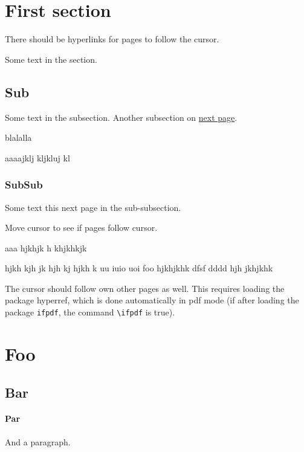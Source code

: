 \documentclass{article}
\begin{document}
\section{First section}

There should be hyperlinks for pages to follow the cursor.  

\tableofcontents



Some text in the section.  
 
\subsection {Sub}

Some text in the subsection. 
Another subsection on \hyperlink{next}{next page}.


blalalla  
\newpage

aaaajklj kljkluj kl
\subsubsection {SubSub} 

Some text this \hypertarget{next}{next page} in the sub-subsection. 

Move cursor to see if pages follow cursor.

\newpage

aaa hjkhjk h
\newpage
khjkhkjk

hjkh kjh jk  hjh kj hjkh k uu iuio uoi foo
hjkhjkhk  dfsf dddd hjh jkhjkhk


The cursor should follow own other pages as well.
This requires loading the package hyperref, which is done
automatically in pdf mode (if after loading the package \texttt{ifpdf}, 
the command \verb"\ifpdf" is true). 



\section{Foo}

\subsection {Bar}


\paragraph {Par}

And a paragraph.
\end{document}
